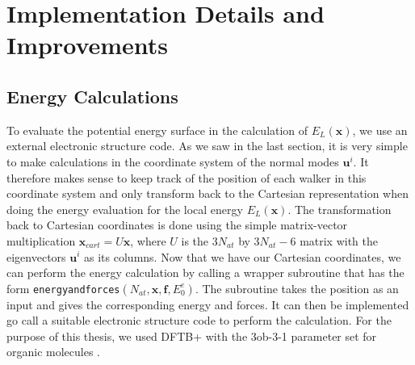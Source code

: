 \documentclass [12pt]{report}
\begin{document}
\section{Implementation Details and Improvements}
\subsection{Energy Calculations}
To evaluate the potential energy surface in the calculation of $E_L(\bm{x})$, we use an external electronic structure code. As we saw in the last section, it is very simple to make calculations in the coordinate system of the normal modes $\bm{u}^i$. It therefore makes sense to keep track of the position of each walker in this coordinate system and only transform back to the Cartesian representation when doing the energy evaluation for the local energy $E_L(\bm{x})$. The transformation back to Cartesian coordinates is done using the simple matrix-vector multiplication $\bm{x}_{cart} = U\bm{x}$, where $U$ is the $3N_{at}$ by $3N_{at} - 6$ matrix with the eigenvectors $\bm{u}^i$ as its columns. Now that we have our Cartesian coordinates, we can perform the energy calculation by calling a wrapper subroutine that has the form \verb|energyandforces|$(N_{at},\bm{x},\bm{f},E^e_0)$. The subroutine takes the position as an input and gives the corresponding energy and forces. It can then be implemented go call a suitable electronic structure code to perform the calculation. For the purpose of this thesis, we used DFTB+ \cite{dftbp} with the 3ob-3-1 parameter set for organic molecules \cite{3ob-3-1}.
\end{document}
